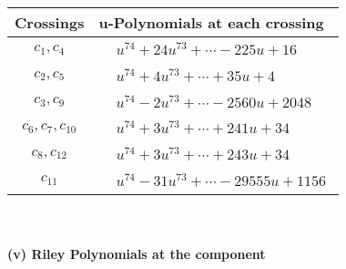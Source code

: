 \documentclass[1p]{elsarticle_modified}
\theoremstyle{definition}
\begin{document}
\begin{tabular}{m{50pt}|m{274pt}}
Crossings & \hspace{64pt}u-Polynomials at each crossing \\
\hline $$\begin{aligned}c_{1},c_{4}\end{aligned}$$&$\begin{aligned}
&u^{74}+24 u^{73}+\cdots-225 u+16
\end{aligned}$\\
\hline $$\begin{aligned}c_{2},c_{5}\end{aligned}$$&$\begin{aligned}
&u^{74}+4 u^{73}+\cdots+35 u+4
\end{aligned}$\\
\hline $$\begin{aligned}c_{3},c_{9}\end{aligned}$$&$\begin{aligned}
&u^{74}-2 u^{73}+\cdots-2560 u+2048
\end{aligned}$\\
\hline $$\begin{aligned}c_{6},c_{7},c_{10}\end{aligned}$$&$\begin{aligned}
&u^{74}+3 u^{73}+\cdots+241 u+34
\end{aligned}$\\
\hline $$\begin{aligned}c_{8},c_{12}\end{aligned}$$&$\begin{aligned}
&u^{74}+3 u^{73}+\cdots+243 u+34
\end{aligned}$\\
\hline $$\begin{aligned}c_{11}\end{aligned}$$&$\begin{aligned}
&u^{74}-31 u^{73}+\cdots-29555 u+1156
\end{aligned}$\\
\hline
\end{tabular}\\~\\
\newpage\renewcommand{\arraystretch}{1}
\flushleft \textbf{(v) Riley Polynomials at the component}\newline \\
\end{document}
